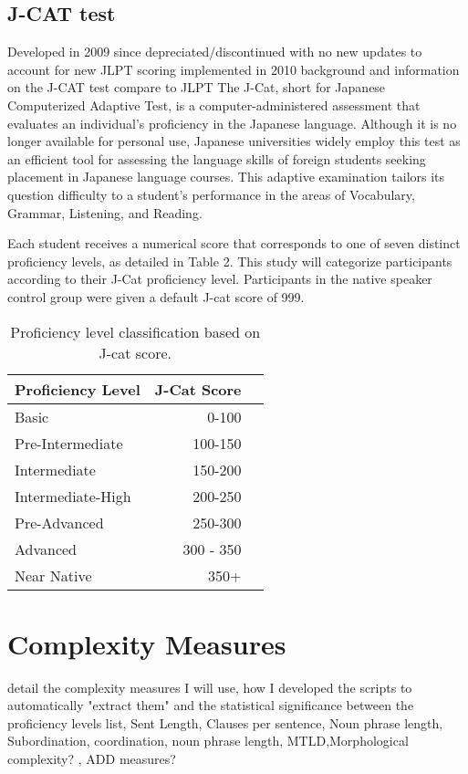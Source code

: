 \subsection{J-CAT test}
Developed in 2009 since depreciated/discontinued with no new updates to account for new JLPT scoring implemented in 2010
background and information on the J-CAT test compare to JLPT
The J-Cat, short for Japanese Computerized Adaptive Test, is a computer-administered assessment that evaluates an individual's proficiency in the Japanese language. Although it is no longer available for personal use, Japanese universities widely employ this test as an efficient tool for assessing the language skills of foreign students seeking placement in Japanese language courses. This adaptive examination tailors its question difficulty to a student's performance in the areas of Vocabulary, Grammar, Listening, and Reading.

Each student receives a numerical score that corresponds to one of seven distinct proficiency levels, as detailed in Table 2. This study will categorize participants according to their J-Cat proficiency level. Participants in the native speaker control group were given a default J-cat score of 999.

\begin{table}
\centering
\begin{tabular}{lrl}
\hline \textbf{Proficiency Level} & \textbf{J-Cat Score} \\ \hline
Basic & 0-100 \\
Pre-Intermediate & 100-150 \\
Intermediate & 150-200 \\
Intermediate-High & 200-250 \\
Pre-Advanced & 250-300 \\
Advanced & 300 - 350 \\
Near Native & 350+\\
\hline
\end{tabular}
\caption{\label{proficency-table} Proficiency level classification based on J-cat score.  }
\end{table}


\section{Complexity Measures}
detail the complexity measures I will use, how I developed the scripts to automatically "extract them" and the statistical significance between the proficiency levels
list, Sent Length, Clauses per sentence, Noun phrase length,  Subordination, coordination, noun phrase length, MTLD,Morphological complexity? , ADD measures?

